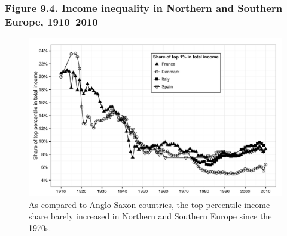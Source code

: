 \documentclass[t]{beamer}\usepackage[]{graphicx}\usepackage[]{color}
\newenvironment{knitrout}{}{} %
\begin{document}
\begin{frame}[label=Figure_9_4]
\frametitle{Figure 9.4. Income inequality in Northern and Southern Europe, 1910--2010}
\begin{figure}[t]
\begin{minipage}[b]{\textwidth}
\centering
\begin{knitrout}\footnotesize
{}\color{fgcolor}

{\centering \includegraphics[width=1\linewidth]{figures/bw/Figure_9_4} 

}



\end{knitrout}
\caption{As compared to Anglo-Saxon countries, the top percentile income share barely increased in Northern and Southern Europe since the 1970s.}
\end{minipage}
\end{figure}
\end{frame}
\end{document}
